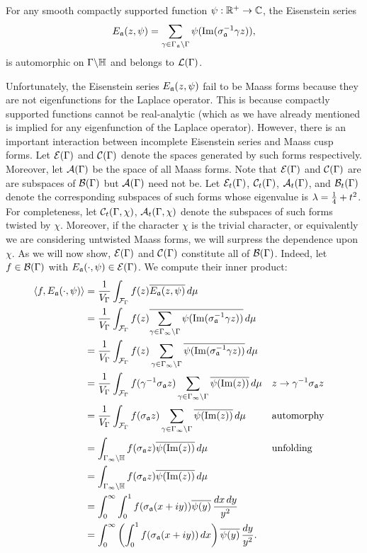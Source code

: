       \begin{theorem}
        For any smooth compactly supported function $\psi:\mathbb{R}^{+} \to \mathbb{C}$, the Eisenstein series
        \[
          E_{\mathfrak{a}}(z,\psi) = \sum_{\gamma \in \Gamma_{\mathfrak{a}}\backslash\Gamma}\psi(\mathrm{Im}(\sigma_{\mathfrak{a}}^{-1}\gamma z)),
        \]
        is automorphic on $\Gamma\backslash\mathbb{H}$ and belongs to $\mathcal{L}(\Gamma)$.
      \end{theorem}
      
      Unfortunately, the Eisenstein series $E_{\mathfrak{a}}(z,\psi)$ fail to be Maass forms because they are not eigenfunctions for the Laplace operator. This is because compactly supported functions cannot be real-analytic (which as we have already mentioned is implied for any eigenfunction of the Laplace operator). However, there is an important interaction between incomplete Eisenstein series and Maass cusp forms. Let $\mathcal{E}(\Gamma)$ and $\mathcal{C}(\Gamma)$ denote the spaces generated by such forms respectively. Moreover, let $\mathcal{A}(\Gamma)$ be the space of all Maass forms. Note that $\mathcal{E}(\Gamma)$ and $\mathcal{C}(\Gamma)$ are are subspaces of $\mathcal{B}(\Gamma)$ but $\mathcal{A}(\Gamma)$ need not be. Let $\mathcal{E}_{t}(\Gamma)$, $\mathcal{C}_{t}(\Gamma)$, $\mathcal{A}_{t}(\Gamma)$, and $\mathcal{B}_{t}(\Gamma)$ denote the corresponding subspaces of such forms whose eigenvalue is $\lambda = \frac{1}{4}+t^{2}$. For completeness, let $\mathcal{C}_{t}(\Gamma,\chi)$, $\mathcal{A}_{t}(\Gamma,\chi)$ denote the subspaces of such forms twisted by $\chi$. Moreover, if the character $\chi$ is the trivial character, or equivalently we are considering untwisted Maass forms, we will surpress the dependence upon $\chi$. As we will now show, $\mathcal{E}(\Gamma)$ and $\mathcal{C}(\Gamma)$ constitute all of $\mathcal{B}(\Gamma)$. Indeed, let $f \in \mathcal{B}(\Gamma)$ with $E_{\mathfrak{a}}(\cdot,\psi) \in \mathcal{E}(\Gamma)$. We compute their inner product:
      \begin{align*}
        \langle f,E_{\mathfrak{a}}(\cdot,\psi)\rangle &= \frac{1}{V_{\Gamma}}\int_{\mathcal{F}_{\Gamma}}f(z)\overline{E_{\mathfrak{a}}(z,\psi)}\,d\mu \\
        &= \frac{1}{V_{\Gamma}}\int_{\mathcal{F}_{\Gamma}}f(z)\overline{\sum_{\gamma \in \Gamma_{\infty}\backslash\Gamma}\psi(\mathrm{Im}(\sigma_{\mathfrak{a}}^{-1}\gamma z))}\,d\mu \\
        &= \frac{1}{V_{\Gamma}}\int_{\mathcal{F}_{\Gamma}}f(z)\sum_{\gamma \in \Gamma_{\infty}\backslash\Gamma}\overline{\psi(\mathrm{Im}(\sigma_{\mathfrak{a}}^{-1}\gamma z))}\,d\mu \\
        &= \frac{1}{V_{\Gamma}}\int_{\mathcal{F}_{\Gamma}}f(\gamma^{-1}\sigma_{\mathfrak{a}}z)\sum_{\gamma \in \Gamma_{\infty}\backslash\Gamma}\overline{\psi(\mathrm{Im}(z))}\,d\mu && \text{$z \to \gamma^{-1}\sigma_{\mathfrak{a}}z$} \\
        &= \frac{1}{V_{\Gamma}}\int_{\mathcal{F}_{\Gamma}}f(\sigma_{\mathfrak{a}}z)\sum_{\gamma \in \Gamma_{\infty}\backslash\Gamma}\overline{\psi(\mathrm{Im}(z))}\,d\mu  && \text{automorphy} \\
        &= \int_{\Gamma_{\infty}\backslash\mathbb{H}}f(\sigma_{\mathfrak{a}}z)\overline{\psi(\mathrm{Im}(z))}\,d\mu && \text{unfolding} \\
        &= \int_{\Gamma_{\infty}\backslash\mathbb{H}}f(\sigma_{\mathfrak{a}}z)\overline{\psi(\mathrm{Im}(z))}\,d\mu \\
        &= \int_{0}^{\infty}\int_{0}^{1}f(\sigma_{\mathfrak{a}}(x+iy))\overline{\psi(y)}\,\frac{dx\,dy}{y^{2}} \\
        &= \int_{0}^{\infty}\left(\int_{0}^{1}f(\sigma_{\mathfrak{a}}(x+iy))\,dx\right)\overline{\psi(y)}\,\frac{dy}{y^{2}}.
      \end{align*}
